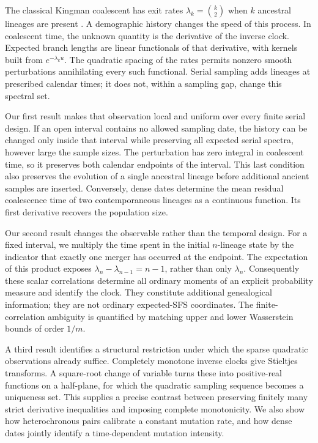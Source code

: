 \documentclass[11pt]{article}
\theoremstyle{definition}
\theoremstyle{remark}
\numberwithin{equation}{section}
\begin{document}
The classical Kingman coalescent has exit rates
$\lambda_k=\binom{k}{2}$ when $k$ ancestral lineages are present
\cite{Kingman}. A demographic history changes the speed of this process.
In coalescent time, the unknown quantity is the derivative of the inverse
clock. Expected branch lengths are linear functionals of that derivative,
with kernels built from $e^{-\lambda_k u}$. The quadratic spacing of the
rates permits nonzero smooth perturbations annihilating every such
functional. Serial sampling adds lineages at prescribed calendar times;
it does not, within a sampling gap, change this spectral set.

Our first result makes that observation local and uniform over every
finite serial design. If an open interval contains no allowed sampling
date, the history can be changed only inside that interval while
preserving all expected serial spectra, however large the sample sizes.
The perturbation has zero integral in coalescent time, so it preserves
both calendar endpoints of the interval. This last condition also
preserves the evolution of a single ancestral lineage before additional
ancient samples are inserted. Conversely, dense dates determine the mean
residual coalescence time of two contemporaneous lineages as a continuous
function. Its first derivative recovers the population size.

Our second result changes the observable rather than the temporal design.
For a fixed interval, we multiply the time spent in the initial
$n$-lineage state by the indicator that exactly one merger has occurred
at the endpoint. The expectation of this product exposes
$\lambda_n-\lambda_{n-1}=n-1$, rather than only $\lambda_n$.
Consequently these scalar correlations determine all ordinary moments of
an explicit probability measure and identify the clock. They constitute
additional genealogical information; they are not ordinary expected-SFS
coordinates. The finite-correlation ambiguity is quantified by matching
upper and lower Wasserstein bounds of order $1/m$.

A third result identifies a structural restriction under which the sparse
quadratic observations already suffice. Completely monotone inverse
clocks give Stieltjes transforms. A square-root change of variable turns
these into positive-real functions on a half-plane, for which the
quadratic sampling sequence becomes a uniqueness set. This supplies a
precise contrast between preserving finitely many strict derivative
inequalities and imposing complete monotonicity. We also show how
heterochronous pairs calibrate a constant mutation rate, and how dense
dates jointly identify a time-dependent mutation intensity.
\end{document}
